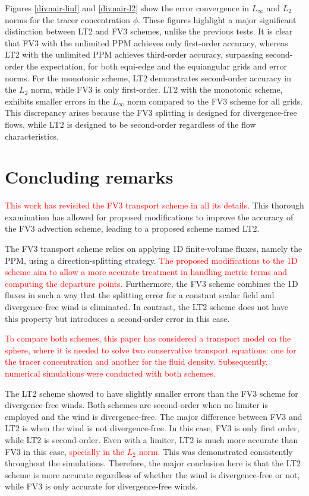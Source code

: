 \documentclass[preprint,12pt]{elsarticle}
\begin{document}
\begin{linenumbers}
Figures \ref{divnair-linf} and \ref{divnair-l2} show the error convergence in $L_{\infty}$ and $L_{2}$ norms for the tracer concentration $\phi$.
These figures highlight a major significant distinction between LT2 and FV3 schemes, unlike the previous tests.
It is clear that FV3 with the unlimited PPM achieves only first-order accuracy, whereas LT2 with the unlimited PPM achieves third-order accuracy, 
surpassing second-order the expectation, for both equi-edge and the equiangular grids and error norms.
For the monotonic scheme, LT2 demonstrates second-order accuracy in the $L_2$ norm, while FV3 is only first-order.
LT2 with the monotonic scheme, exhibits smaller errors in the $L_{\infty}$ norm compared to the FV3 scheme for all grids.
This discrepancy arises because the FV3 splitting is designed for divergence-free flows, while LT2 is designed to be second-order regardless of the flow characteristics.

\section{Concluding remarks}
\label{conclusion}
\textcolor{red}{This work has revisited the FV3 transport scheme in all its details}. This thorough examination has allowed for proposed modifications to improve the accuracy of the FV3 advection scheme, leading to a proposed scheme named LT2.

The FV3 transport scheme relies on applying 1D finite-volume fluxes, namely the PPM, using a direction-splitting strategy.
\textcolor{red}{The proposed modifications to the 1D scheme aim to allow a more accurate treatment in handling metric terms and computing the departure points.}
Furthermore, the FV3 scheme combines the 1D fluxes in such a way that the splitting error for a constant scalar field and divergence-free wind is eliminated.
In contrast, the LT2 scheme does not have this property but introduces a second-order error in this case.

\textcolor{red}{To compare both schemes, this paper has considered a transport model on the sphere, where it is needed to solve two conservative transport equations: one for the tracer concentration and another for the fluid density. 
Subsequently, numerical simulations were conducted with both schemes.}

The LT2 scheme showed to  have slightly smaller errors than the FV3 scheme for divergence-free winds.
Both schemes are second-order when no limiter is employed and the wind is divergence-free.
The major difference between FV3 and LT2 is when the wind is not divergence-free.
In this case, FV3 is only first order, while LT2 is second-order. Even with a limiter, LT2 is much more accurate than FV3 in this case, \textcolor{red}{specially in the $L_2$ norm.}
This was demonstrated consistently throughout the simulations.
Therefore, the major conclusion here is that the LT2 scheme is more accurate regardless of whether the wind is divergence-free or not, while FV3 is only accurate for divergence-free winds.


\end{linenumbers}
\end{document}

